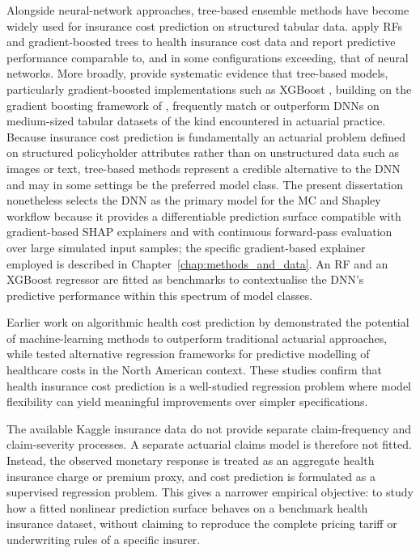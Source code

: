 \noindent
Alongside neural-network approaches, tree-based ensemble methods have become
widely used for insurance cost prediction on structured tabular data.
\citet{orji2024explainable} apply RFs and gradient-boosted trees to
health insurance cost data and report predictive performance comparable to, and
in some configurations exceeding, that of neural networks.  More broadly,
\citet{grinsztajn2022why} provide systematic evidence that tree-based models,
particularly gradient-boosted implementations such as XGBoost
\citep{chen2016xgboost}, building on the gradient boosting framework of
\citet{friedman2001greedy}, frequently match or outperform DNNs
on
medium-sized tabular datasets of the kind encountered in actuarial practice.
Because insurance cost prediction is fundamentally an actuarial problem defined
on structured policyholder attributes rather than on unstructured data such as
images or text, tree-based methods represent a credible alternative to the
DNN and may in some settings be the preferred model class.  The present
dissertation nonetheless selects the DNN as the primary model for the
MC and Shapley workflow because it provides a differentiable
prediction surface compatible with gradient-based SHAP explainers and
with continuous forward-pass evaluation over large simulated input samples;
the specific gradient-based explainer employed is described in
Chapter~\ref{chap:methods_and_data}.  An RF
and an XGBoost regressor are fitted as benchmarks to contextualise the
DNN's predictive performance within this spectrum of model classes.

\noindent
Earlier work on algorithmic health cost prediction by
\citet{bertsimas2008algorithmic} demonstrated the potential of machine-learning
methods to outperform traditional actuarial approaches, while
\citet{duncan2016testing} tested alternative regression frameworks for
predictive modelling of healthcare costs in the North American context.
These studies confirm that health insurance cost prediction is a well-studied
regression problem where model flexibility can yield meaningful improvements
over simpler specifications.

\noindent
The available Kaggle insurance data \citep{kaggleInsuranceDataML} do not provide separate claim-frequency and
claim-severity processes. A separate actuarial claims model is therefore not
fitted. Instead, the observed monetary response is treated as an aggregate
health insurance charge or premium proxy, and cost prediction is formulated as a
supervised regression problem. This gives a narrower empirical objective: to
study how a fitted nonlinear prediction surface behaves on a benchmark
health insurance dataset, without claiming to reproduce the complete pricing
tariff or underwriting rules of a specific insurer.

